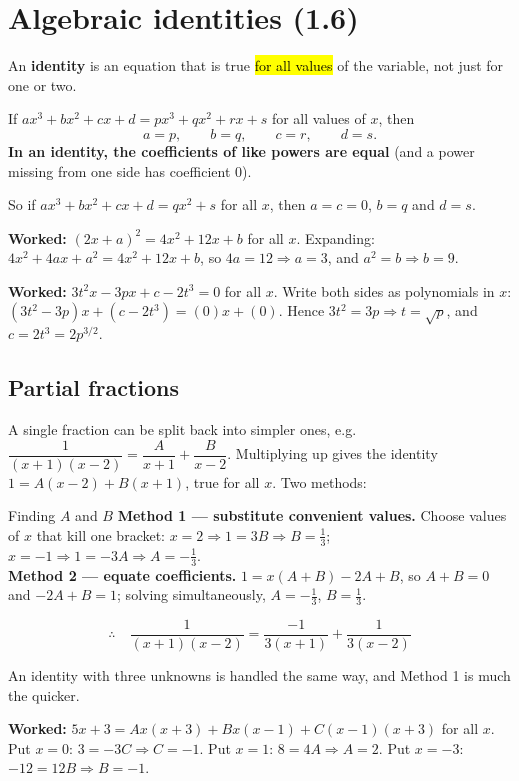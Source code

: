 \documentclass[11pt]{article}
\newcommand{\key}[1]{\hl{#1}}
\newcommand{\wex}[1]{\textbf{\color{lilacdeep}Worked:} #1}
\begin{document}
\section{Algebraic identities (1.6)}

An \textbf{identity} is an equation that is true \key{for all values} of the variable, not just for one or two.

\begin{formulabox}
If $ax^{3}+bx^{2}+cx+d=px^{3}+qx^{2}+rx+s$ for all values of $x$, then
\[a=p,\qquad b=q,\qquad c=r,\qquad d=s.\]
\textbf{In an identity, the coefficients of like powers are equal} (and a power missing from one side has coefficient 0).
\end{formulabox}

So if $ax^{3}+bx^{2}+cx+d=qx^{2}+s$ for all $x$, then $a=c=0$, $b=q$ and $d=s$.

\wex{$(2x+a)^{2}=4x^{2}+12x+b$ for all $x$. Expanding: $4x^{2}+4ax+a^{2}=4x^{2}+12x+b$, so $4a=12\Rightarrow a=3$, and $a^{2}=b\Rightarrow b=9$.}

\wex{$3t^{2}x-3px+c-2t^{3}=0$ for all $x$. Write both sides as polynomials in $x$: $(3t^{2}-3p)x+(c-2t^{3})=(0)x+(0)$. Hence $3t^{2}=3p\Rightarrow t=\sqrt p$, and $c=2t^{3}=2p^{3/2}$.}

\subsection*{Partial fractions}

A single fraction can be split back into simpler ones, e.g.\ $\dfrac{1}{(x+1)(x-2)}=\dfrac{A}{x+1}+\dfrac{B}{x-2}$. Multiplying up gives the identity $1=A(x-2)+B(x+1)$, true for all $x$. Two methods:

\begin{methodbox}{Finding $A$ and $B$}
\textbf{Method 1 --- substitute convenient values.} Choose values of $x$ that kill one bracket:
$x=2\Rightarrow 1=3B\Rightarrow B=\frac13$; \ $x=-1\Rightarrow1=-3A\Rightarrow A=-\frac13$.\\[2pt]
\textbf{Method 2 --- equate coefficients.} $1=x(A+B)-2A+B$, so $A+B=0$ and $-2A+B=1$; solving simultaneously, $A=-\frac13$, $B=\frac13$.
\end{methodbox}
\[\therefore\quad \frac{1}{(x+1)(x-2)}=\frac{-1}{3(x+1)}+\frac{1}{3(x-2)}\]

An identity with three unknowns is handled the same way, and Method 1 is much the quicker.

\wex{$5x+3=Ax(x+3)+Bx(x-1)+C(x-1)(x+3)$ for all $x$. Put $x=0$: $3=-3C\Rightarrow C=-1$. Put $x=1$: $8=4A\Rightarrow A=2$. Put $x=-3$: $-12=12B\Rightarrow B=-1$.}
\end{document}
